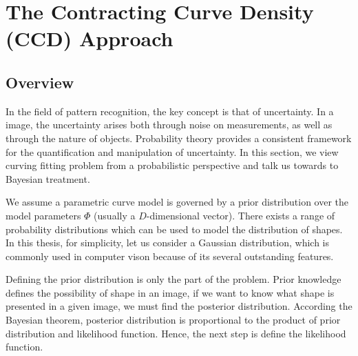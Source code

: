 \section{The Contracting Curve Density (CCD) Approach}
\label{sec:sketch}

\subsection{Overview}
\label{sec:overview}

In the field of pattern recognition, the key concept is that of
uncertainty. In a image, the uncertainty arises both
through noise on measurements, as well as through the nature of
objects. Probability theory provides a consistent framework for the
quantification and manipulation of uncertainty.  In this section, we
view curving fitting problem from a probabilistic perspective and talk
us towards to Bayesian treatment.

We assume a parametric curve model is governed by a prior distribution
over the model parameters $\Phi$ (usually a $D$-dimensional
vector). There exists a range of probability distributions which can
be used to model the distribution of shapes. In this thesis, for
simplicity, let us consider a Gaussian distribution, which is commonly
used in computer vison because of its several outstanding features.


Defining the prior distribution is only the part of the problem. Prior knowledge
defines the possibility of shape in an image, if we want to know what
shape is presented in a given image, we must find the posterior
distribution. According the Bayesian theorem, posterior distribution
is proportional to the product of prior distribution and likelihood
function. Hence, the next step is define the likelihood function.

